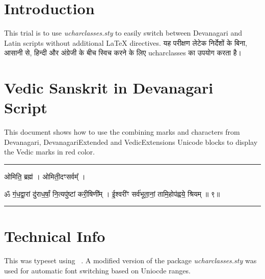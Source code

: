 \documentclass{article}
\begin{document}
\obeylines 
\section*{Introduction}
This trial is to use \emph{ucharclasses.sty} to easily switch between Devanagari and Latin scripts without additional {\selectfont \LaTeX} directives.
\medskip
यह परीक्षण लेटेक निर्देशों के बिना, आसानी से, हिन्दी और अंग्रेजी के बीच स्विच करने के लिए ucharclasses का उपयोग करता है। 

\section*{Vedic Sanskrit in Devanagari Script}
This document shows how to use the combining marks and characters from Devanagari, DevanagariExtended and VedicExtensions Unicode blocks to display the Vedic marks in red color.

\medskip\hrule\medskip

ओमिति॒ ब्रह्म॑ । ओमिती॒दꣳसर्वम्᳚ ।

ॐ
गं॒ध॒द्वा॒रां दु॑राध॒र्षां॒ नि॒त्यपु॑ष्टां करी॒षिणी᳚म् । 
ई॒श्वरी॑ꣳ सर्व॑भूता॒नां॒ तामि॒होप॑ह्वये॒ श्रियम् ॥ ९॥ 

\medskip\hrule\medskip
\section*{Technical Info}

This was typeset using \XeLaTeX \ \the\XeTeXversion\XeTeXrevision . A modified version of the package \emph{ucharclasses.sty} was used for automatic font switching based on Uniocde ranges.
\end{document}

